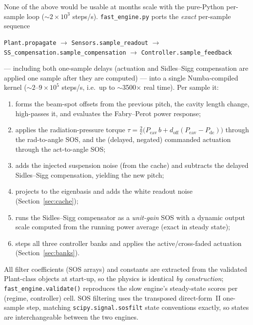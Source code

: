 \documentclass[11pt,a4paper]{article}
\newcommand{\code}[1]{\texttt{#1}}
\begin{document}
None of the above would be usable at months scale with the pure-Python per-sample loop
($\sim 2\times10^{3}$ steps/s). \code{fast\_engine.py} ports the \emph{exact} per-sample
sequence
\begin{center}
  \code{Plant.propagate} $\to$ \code{Sensors.sample\_readout} $\to$
  \code{SS\_compensation.sample\_compensation} $\to$ \code{Controller.sample\_feedback}
\end{center}
--- including both one-sample delays (actuation and Sidles--Sigg compensation are applied
one sample after they are computed) --- into a single Numba-compiled kernel
($\sim 2$--$9\times10^{5}$ steps/s, i.e.\ up to $\sim$3500$\times$ real time). Per sample it:
\begin{enumerate}
  \item forms the beam-spot offsets from the previous pitch, the cavity length change,
        high-passes it, and evaluates the Fabry--Perot power response;
  \item applies the radiation-pressure torque
        $\tau = \tfrac{2}{c}\big(P_{\mathrm{cav}}\,b + d_{\mathrm{off}}(P_{\mathrm{cav}}-P_{\mathrm{dc}})\big)$
        through the rad-to-angle SOS, and the (delayed, negated) commanded actuation
        through the act-to-angle SOS;
  \item adds the injected suspension noise (from the cache) and subtracts the delayed
        Sidles--Sigg compensation, yielding the new pitch;
  \item projects to the eigenbasis and adds the white readout noise
        (Section~\ref{sec:cache});
  \item runs the Sidles--Sigg compensator as a \emph{unit-gain} SOS with a dynamic
        output scale computed from the running power average (exact in steady state);
  \item steps all three controller banks and applies the active/cross-faded actuation
        (Section~\ref{sec:banks}).
\end{enumerate}
All filter coefficients (SOS arrays) and constants are extracted from the validated
Plant-class objects at start-up, so the physics is identical \emph{by construction};
\code{fast\_engine.validate()} reproduces the slow engine's steady-state scores per
(regime, controller) cell. SOS filtering uses the transposed direct-form~II
one-sample step, matching \code{scipy.signal.sosfilt} state conventions exactly, so
states are interchangeable between the two engines.

\end{document}
